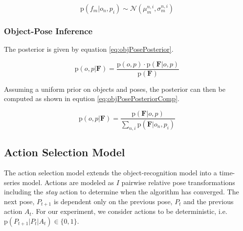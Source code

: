 \documentclass[conference]{IEEEtran}
\newcommand{\prob}[1]{\text{p}(#1)} %
\newcommand{\set}[1]{\mathbf{#1}} %
\newcommand{\italic}[1]{\textit{#1}} %
\newcommand{\cursive}[1]{\mathcal{#1}}
\begin{document}
        \begin{equation}
            \prob{f_m|o_n,p_i} \sim \cursive{N}(\mu_{m}^{n,i},\sigma_{m}^{n,i})
        \end{equation}


    \subsubsection{Object-Pose Inference}

        The posterior is given by equation \ref{eq:objPosePosterior}.

        \begin{equation}
            \label{eq:objPosePosterior}
            \prob{o,p|\set{F}} = \frac{\prob{o,p} \cdot \prob{\set{F}|o,p}}{\prob{\set{F}}}
        \end{equation}



        Assuming a uniform prior on objects and poses, the posterior can then be computed as shown in eqution \ref{eq:objPosePosteriorComp}.

        \begin{equation}
            \label{eq:objPosePosteriorComp}
            \prob{o,p|\set{F}} = \frac{\prob{\set{F}|o,p}}{\sum_{n,i} \prob{\set{F}|o_n,p_i}}
        \end{equation}


    \subsection{Action Selection Model}
        The action selection model extends the object-recognition model into a time-series model. Actions are modeled as $I$ pairwise relative pose transformations including the \italic{stay} action to determine when the algorithm has converged. The next pose, $P_{t+1}$ is dependent only on the previous pose, $P_t$ and the previous action $A_t$. For our experiment, we consider actions to be deterministic, i.e. $\prob{P_{t+1}|P_t|A_t} \in \{ 0 , 1 \}$.
\end{document}
